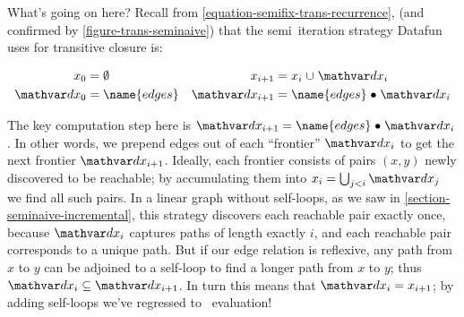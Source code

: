 \nopagebreak[3]
\begin{center}
  \small\sffamily
\end{center}

\noindent
What's going on here?
%
Recall from \cref{equation-semifix-trans-recurrence},  (and confirmed by \cref{figure-trans-seminaive}) that the semi\naive\ iteration strategy Datafun uses for transitive closure is:

\begin{align*}
  x_0 &= \emptyset
  &
  x_{i+1} &= x_i \cup \dx_i
  \\
  \dx_0 &= \name{edges}
  &
  \dx_{i+1} &= \name{edges} \relcomp \dx_i
\end{align*}

\noindent
The key computation step here is $\dx_{i+1} = \name{edges} \relcomp \dx_i$.
%
In other words, we prepend edges out of each ``frontier'' $\dx_i$ to get the next frontier $\dx_{i+1}$.
%
Ideally, each frontier consists of pairs $(x,y)$ newly discovered to be reachable; by accumulating them into $x_i = \bigcup_{j<i} \dx_j$ we find all such pairs.
%
In a linear graph without self-loops, as we saw in \cref{section-seminaive-incremental}, this strategy discovers each reachable pair exactly once, because $\dx_i$ captures paths of length exactly $i$, and each reachable pair corresponds to a unique path.
%
But if our edge relation is reflexive, any path from $x$ to $y$ can be adjoined to a self-loop to find a longer path from $x$ to $y$; thus $\dx_i \subseteq \dx_{i+1}$.
%
In turn this means that $\dx_i = x_{i+1}$; by adding self-loops we've regressed to \naive\ evaluation!

